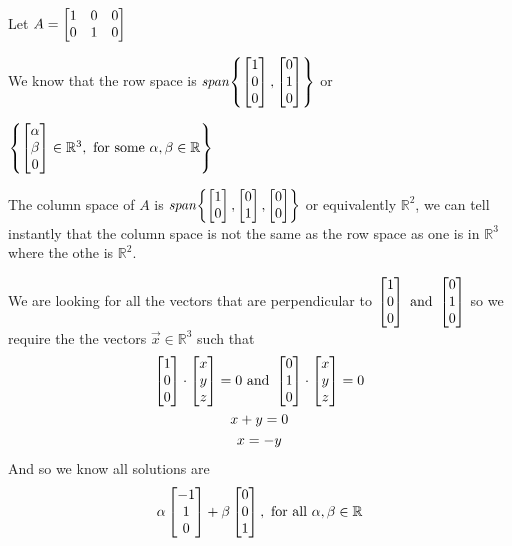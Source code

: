 \documentclass[11pt]{book}
\begin{document}
Let $A = \begin{bmatrix} 1 & 0 & 0 \\ 0 & 1 & 0 \end{bmatrix}$ 

\begin{eg}
    We know that the row space is $\mathit{span} {\left\{ \begin{bmatrix} 1 \\ 0 \\ 0 \end{bmatrix}, \begin{bmatrix} 0 \\ 1 \\ 0 \end{bmatrix} \right\}} $ or
    
    $\left\{ \begin{bmatrix} \alpha \\ \beta \\ 0 \end{bmatrix} \in \mathbb{R}^3, \text{ for some } \alpha, \beta \in \mathbb{R} \right\}$  
\end{eg}

\begin{eg}
    The column space of $A$ is $\mathit{span} {\left\{ \begin{bmatrix} 1 \\ 0 \end{bmatrix}, \begin{bmatrix} 0 \\ 1 \end{bmatrix}, \begin{bmatrix} 0 \\ 0 \end{bmatrix} \right\}} $ or equivalently $\mathbb{R}^2$, we can tell instantly that the column space is not the same as the row space as one is in $\mathbb{R}^{3}$ where the othe is $\mathbb{R}^2$. 
\end{eg}

\begin{eg}
    We are looking for all the vectors that are perpendicular to $\begin{bmatrix} 1 \\ 0 \\ 0 \end{bmatrix} \text{ and  } \begin{bmatrix} 0 \\ 1 \\ 0 \end{bmatrix}$ so we require the the vectors $\vec{x} \in \mathbb{R}^3$ such that 
    \begin{gather*}
        \begin{bmatrix} 1 \\ 0 \\ 0 \end{bmatrix} \cdot \begin{bmatrix} x \\ y \\ z \end{bmatrix} = 0 \text{ and } \begin{bmatrix} 0 \\ 1 \\ 0 \end{bmatrix} \cdot \begin{bmatrix} x \\ y \\ z \end{bmatrix} = 0\\
        x + y = 0\\
        x = -y
    \end{gather*}
    And so we know all solutions are 
    \begin{equation*}
        \alpha \begin{bmatrix} -1 \\ 1 \\ 0 \end{bmatrix} + \beta \begin{bmatrix} 0 \\ 0 \\ 1 \end{bmatrix}, \text{ for all } \alpha, \beta \in \mathbb{R}
    \end{equation*}
\end{eg}
\end{document}

